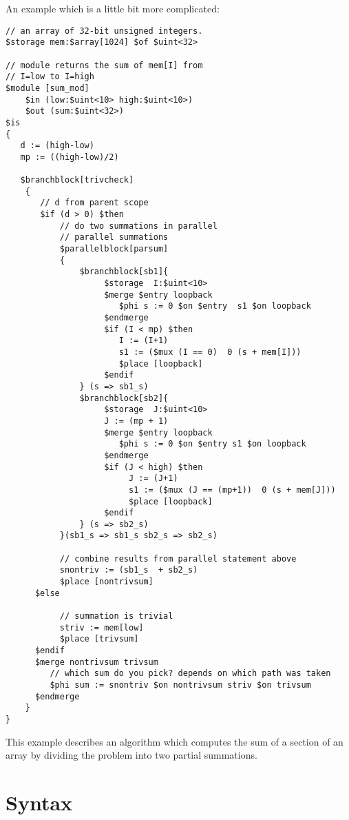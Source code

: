 \documentclass{article}
\begin{document}
An example which is a little bit more complicated:
\begin{verbatim}
// an array of 32-bit unsigned integers.
$storage mem:$array[1024] $of $uint<32>   

// module returns the sum of mem[I] from
// I=low to I=high
$module [sum_mod]
    $in (low:$uint<10> high:$uint<10>)
    $out (sum:$uint<32>)
$is
{
   d := (high-low)  
   mp := ((high-low)/2)

   $branchblock[trivcheck]
    {
       // d from parent scope
       $if (d > 0) $then  
           // do two summations in parallel
           // parallel summations
           $parallelblock[parsum]
           {
               $branchblock[sb1]{
                    $storage  I:$uint<10>
                    $merge $entry loopback
                       $phi s := 0 $on $entry  s1 $on loopback
                    $endmerge
                    $if (I < mp) $then
                       I := (I+1)
                       s1 := ($mux (I == 0)  0 (s + mem[I]))
                       $place [loopback]
                    $endif
               } (s => sb1_s)
               $branchblock[sb2]{
                    $storage  J:$uint<10>
                    J := (mp + 1)
                    $merge $entry loopback
                       $phi s := 0 $on $entry s1 $on loopback
                    $endmerge
                    $if (J < high) $then
                         J := (J+1)
                         s1 := ($mux (J == (mp+1))  0 (s + mem[J]))
                         $place [loopback]
                    $endif
               } (s => sb2_s)
           }(sb1_s => sb1_s sb2_s => sb2_s)
 
           // combine results from parallel statement above
           snontriv := (sb1_s  + sb2_s)
           $place [nontrivsum]
      $else

           // summation is trivial 
           striv := mem[low]
           $place [trivsum]
      $endif
      $merge nontrivsum trivsum
         // which sum do you pick? depends on which path was taken
         $phi sum := snontriv $on nontrivsum striv $on trivsum
      $endmerge
    }
}
\end{verbatim} 
This example describes an algorithm which computes the sum of
a section of an array by dividing the problem into two partial
summations. 

\section{Syntax} \label{sec:Syntax}
\end{document}
